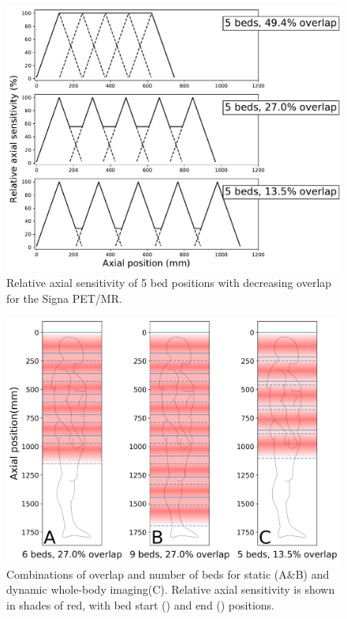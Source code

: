 \begin{figure} [ht!]
\centering
\includegraphics[scale=0.5,angle=0]{2_Theory_Methods/figures/SensitivityProfiles_3Options.pdf}
\caption{Relative axial sensitivity of 5 bed positions with decreasing overlap for the Signa PET/MR.} 
\label{fig3_1:decreasingOverlap}
\end{figure}
%
%
\begin{figure} [ht!]
\centering
\includegraphics[scale=0.5,angle=0]{3_Results/3_1_DWB_Optimization/figures/SensitivityProfiles_overHuman.png}
\caption{Combinations of overlap and number of beds for static (A\&B) and dynamic whole-body imaging(C). Relative axial sensitivity is shown in shades of red, with bed start (\protect{}) and end (\protect{}) positions.} 
\label{fig3_1:BodyCoverage}
\end{figure}
%
%
%
